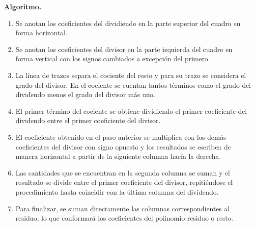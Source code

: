 \textbf{Algoritmo.}
\begin{enumerate}
    \item Se anotan los coeficientes del dividiendo en la parte superior del cuadro en forma horizontal.
    \item Se anotan los coeficientes del divisor en la parte izquierda del cuadro en forma vertical con los signos cambiados a excepción del primero.
    \item La línea de trazos separa el cociente del resto y para su trazo se considera el grado del divisor.
    En el cociente se cuentan tantos términos como el grado del dividendo menos el grado del divisor más uno.
    \item El primer término del cociente se obtiene dividiendo el primer coeficiente del dividendo entre el primer coeficiente del divisor.
    \item El coeficiente obtenido en el paso anterior se multiplica con los demás coeficientes del divisor con signo opuesto y los resultados se escriben de manera horizontal a partir de la siguiente columna hacía la derecha.
    \item Las cantidades que se encuentran en la segunda columna se suman y el resultado se divide entre el primer coeficiente del divisor, repitiéndose el procedimiento hasta coincidir con la última columna del dividendo.
    \item Para finalizar, se suman directamente las columnas correspondientes al residuo, lo que conformará los coeficientes del polinomio residuo o resto.
\end{enumerate}

